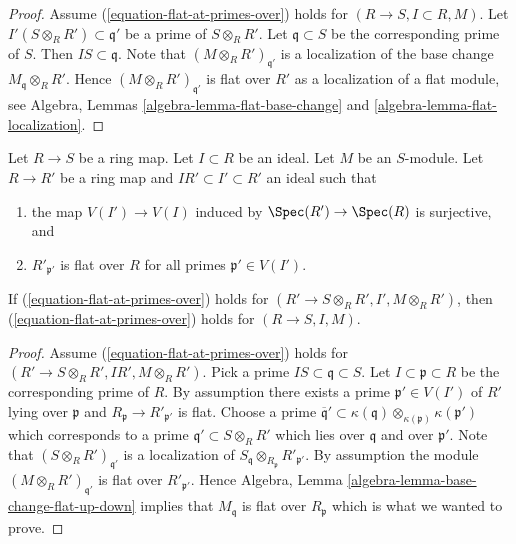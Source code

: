 \begin{proof}
Assume (\ref{equation-flat-at-primes-over}) holds for
$(R \to S, I \subset R, M)$.
Let $I'(S \otimes_R R') \subset \mathfrak q'$ be a prime of $S \otimes_R R'$.
Let $\mathfrak q \subset S$ be the corresponding prime of $S$.
Then $IS \subset \mathfrak q$. Note that $(M \otimes_R R')_{\mathfrak q'}$
is a localization of the base change $M_{\mathfrak q} \otimes_R R'$.
Hence $(M \otimes_R R')_{\mathfrak q'}$ is flat over $R'$ as a localization
of a flat module, see
Algebra, Lemmas \ref{algebra-lemma-flat-base-change} and
\ref{algebra-lemma-flat-localization}.
\end{proof}

\begin{lemma}
\label{lemma-flat-descent-flat-at-primes-over}
Let $R \to S$ be a ring map.
Let $I \subset R$ be an ideal.
Let $M$ be an $S$-module.
Let $R \to R'$ be a ring map and $IR' \subset I' \subset R'$ an ideal
such that
\begin{enumerate}
\item the map $V(I') \to V(I)$ induced by
$\Spec(R') \to \Spec(R)$ is surjective, and
\item $R'_{\mathfrak p'}$ is flat over $R$ for all primes
$\mathfrak p' \in V(I')$.
\end{enumerate}
If (\ref{equation-flat-at-primes-over}) holds for
$(R' \to S \otimes_R R', I', M \otimes_R R')$, then
(\ref{equation-flat-at-primes-over}) holds for $(R \to S, I, M)$.
\end{lemma}

\begin{proof}
Assume (\ref{equation-flat-at-primes-over}) holds for
$(R' \to S \otimes_R R', IR', M \otimes_R R')$. Pick a prime
$IS \subset \mathfrak q \subset S$. Let $I \subset \mathfrak p \subset R$
be the corresponding prime of $R$. By assumption there exists
a prime $\mathfrak p' \in V(I')$ of $R'$ lying over $\mathfrak p$ and
$R_{\mathfrak p} \to R'_{\mathfrak p'}$ is flat. Choose a prime
$\overline{\mathfrak q}' \subset
\kappa(\mathfrak q) \otimes_{\kappa(\mathfrak p)} \kappa(\mathfrak p')$
which corresponds to a prime $\mathfrak q' \subset S \otimes_R R'$ which
lies over $\mathfrak q$ and over $\mathfrak p'$. Note that
$(S \otimes_R R')_{\mathfrak q'}$ is a localization of
$S_{\mathfrak q} \otimes_{R_{\mathfrak p}} R'_{\mathfrak p'}$.
By assumption the module $(M \otimes_R R')_{\mathfrak q'}$ is
flat over $R'_{\mathfrak p'}$. Hence
Algebra, Lemma \ref{algebra-lemma-base-change-flat-up-down}
implies that $M_{\mathfrak q}$ is flat over $R_{\mathfrak p}$
which is what we wanted to prove.
\end{proof}

